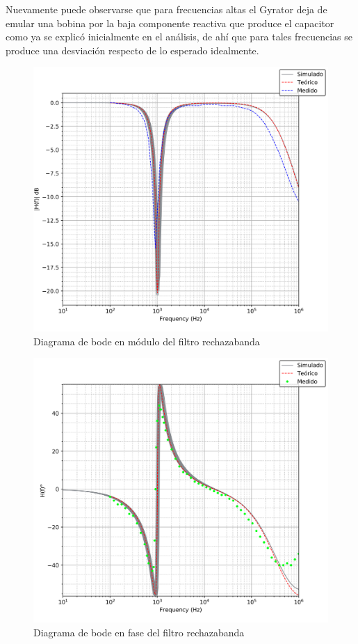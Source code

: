 Nuevamente puede observarse que para frecuencias altas el Gyrator deja de emular una bobina por la baja componente reactiva que produce el capacitor
como ya se explic\'o inicialmente en el an\'alisis, de ah\'i que para tales frecuencias se produce una desviaci\'on respecto de lo esperado idealmente.

\begin{figure}[H]
    \centering
        \includegraphics[scale=0.5]{../EJ2/Recursos/bode_rechazabanda_modulo.png}
    \caption{Diagrama de bode en m\'odulo del filtro rechazabanda}
    \label{fig:bode_rechazanda_modulo}
\end{figure}

\begin{figure}[H]
    \centering
        \includegraphics[scale=0.5]{../EJ2/Recursos/bode_rechazabanda_fase.png}
    \caption{Diagrama de bode en fase del filtro rechazabanda}
    \label{fig:bode_rechazabanda_fase}
\end{figure}

